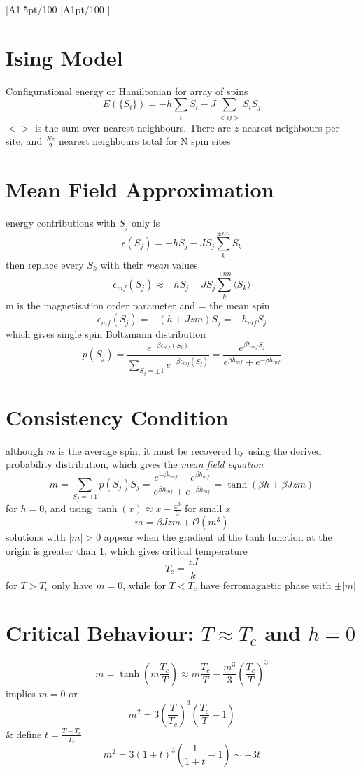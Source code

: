 \documentclass[table,cmyk]{article}
\makeatletter
\newcommand\ratio[2]{\strip@pt\dimexpr#1pt/#2\relax}
\makeatother
\begin{document}
\begin{longtable}
{
    |A{1.5}{\ratio{50}{100}}%
    |A{1}{\ratio{50}{100}}%
    |%
}\hline
\section*{Ising Model}
Configurational energy or Hamiltonian for array of spins
\[E(\{S_i\}) = -h\sum_{i} S_i - J\sum_{<ij>}S_i S_j\]
$<>$ is the sum over nearest neighbours. There are $z$ nearest neighbours per site, and $\frac{Nz}{2}$ nearest neighbours total for N spin sites

\section{Mean Field Approximation}
energy contributions with $S_j$ only is 
\[\epsilon(S_j) = -hS_j - JS_j\sum_{k}^{\pm nn}S_k\]
then replace every $S_k$ with their \textit{mean} values
\[\epsilon_{mf}(S_j) \approx -hS_j - JS_j\sum_{k}^{\pm nn} \langle S_k\rangle\]
m is the magnetisation order parameter and = the mean spin
\[\epsilon_{mf}(S_j) = -(h+Jzm)S_j = -h_{mf}S_j\]
which gives single spin Boltzmann distribution
\[p(S_j) = \frac{e^{-\beta\epsilon_{mf}(S_i)}}{\sum_{S_j = \pm 1} e^{-\beta\epsilon_{mf}(S_j)}}=\frac{e^{\beta h_{mf}S_j}}{e^{\beta h_{mf}}+e^{-\beta h_{mf}}}\]
\section{Consistency Condition}
although $m$ is the average spin, it must be recovered by using the derived probability distribution, which gives the \textit{mean field equation}
\[ m = \sum_{S_j = \pm 1}p(S_j)S_j =  \frac{e^{-\beta\epsilon_{mf}} - e^{\beta h_{mf}}}{{e^{\beta h_{mf}}+e^{-\beta h_{mf}}}}=\tanh({\beta h+\beta Jzm})\]
for $h = 0$, and using $\tanh(x) \approx x - \frac{x^3}{3}$ for small $x$
\[ m = \beta Jzm + \mathcal{O}(m^3)\]
solutions with $|m| > 0$ appear when the gradient of the tanh function at the origin is greater than $1$, which gives critical temperature
\[ T_c = \frac{zJ}{k}\]
for $T>T_c$ only have $m=0$, while for $T<T_c$ have ferromagnetic phase with $\pm|m|$
\section*{Critical Behaviour: $T\approx T_c$ and $h=0$}
\[m=\tanh\left(m\frac{T_c}{T}\right) \approx m\frac{T_c}{T} - \frac{m^3}{3}\left(\frac{T_c}{T}\right)^3\]
implies $m=0$ or
\[ m^2 = 3\left(\frac{T}{T_c}\right)^3\left(\frac{T_c}{T}-1\right)\]
&
define $t = \frac{T-T_c}{T_c}$
\[m^2 = 3(1+t)^3\left(\frac{1}{1+t} - 1\right) \sim -3t\]


\end{longtable}
\end{document}
